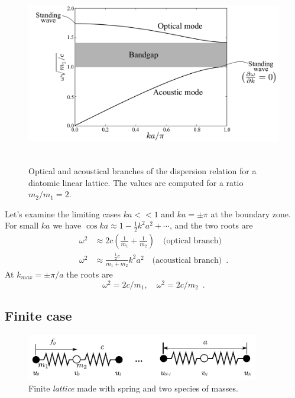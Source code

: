\documentclass[12pt,letterpaper]{article}
\begin{document}
\begin{figure}[h]
\centering
\includegraphics[height=8cm]{img/diatomic-plot.pdf} 
\caption{Optical and acoustical branches of the dispersion relation for a diatomic linear lattice. The values are computed for a ratio $m_2/m_1 = 2$.}
\label{fig:diatomic_dispersion}
\end{figure}
Let's examine the limiting cases $ka<<1$ and $ka=\pm \pi$ at the boundary zone. For small $ka$ we have $\cos ka \approx 1 - \frac{1}{2}k^2a^2 + \cdots$, and the two roots are
\begin{align}
\omega^2 &\approx 2c\left(\frac{1}{m_1} + \frac{1}{m_2}\right)\quad \mbox{(optical branch)}\\
\omega^2 &\approx \frac{\frac{1}{2}c}{m_1+m_2}k^2a^2\quad \mbox{(acoustical branch)} \enspace  .
\end{align}
At $k_{max}=\pm\pi/a$ the roots are
\[\omega^2 = 2c/m_1,\quad \omega^2 = 2c/m_2 \enspace .\]

\subsection{Finite case}
\begin{figure}[h]
\centering
\includegraphics[width=4in]{img/diatomic-finite.pdf} 
\caption{Finite \emph{lattice} made with spring and two species of masses.}
\label{fig:diatomic-finite}
\end{figure}
\end{document}
